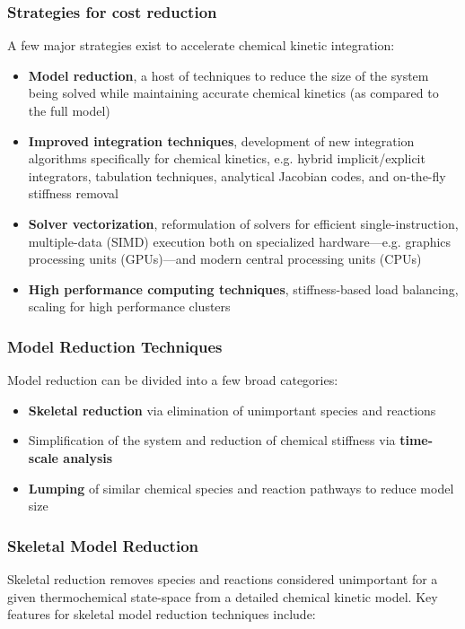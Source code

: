 \documentclass{beamer}
\begin{document}
\begin{frame}
 \frametitle{Strategies for cost reduction}
 A few major strategies exist to accelerate chemical kinetic integration:
 \begin{itemize}
  \item \textbf{Model reduction}, a host of techniques to reduce the size of the system being solved while maintaining accurate chemical kinetics (as compared to the full model)
  \item \textbf{Improved integration techniques}, development of new integration algorithms specifically for chemical kinetics, e.g. hybrid implicit\slash explicit integrators, tabulation techniques, analytical Jacobian codes, and on-the-fly stiffness removal
  \item \textbf{Solver vectorization}, reformulation of solvers for efficient single-instruction, multiple-data (SIMD) execution both on specialized hardware---e.g. graphics processing units (GPUs)---and modern central processing units (CPUs)
  \item \textbf{High performance computing techniques}, stiffness-based load balancing, scaling for high performance clusters
 \end{itemize}
\end{frame}

\begin{frame}
 \frametitle{Model Reduction Techniques}
 Model reduction can be divided into a few broad categories:
 \begin{itemize}
  \item \textbf{Skeletal reduction} via elimination of unimportant species and reactions
  \item Simplification of the system and reduction of chemical stiffness via \textbf{time-scale analysis}
  \item \textbf{Lumping} of similar chemical species and reaction pathways to reduce model size
 \end{itemize}
\end{frame}

\begin{frame}
 \frametitle{Skeletal Model Reduction}
 Skeletal reduction removes species and reactions considered unimportant for a given thermochemical state-space from a detailed chemical kinetic model.
 Key features for skeletal model reduction techniques include:
 \begin{itemize}
  \item \textit{A priori} error control, to avoid expensive model validation after reduction
  \item \textit{
 \end{itemize}

 
\end{frame}
\end{document}
